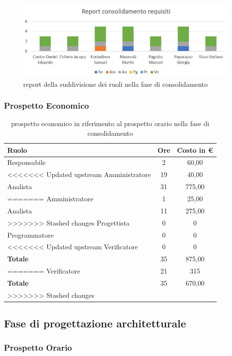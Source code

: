 \documentclass[../piano_di_progetto.tex]{subfiles}
\begin{document}
\begin{figure}[H]
\centering
\includegraphics[width=12cm]{componenti/img/report_consolidamento}
\caption{report della suddivisione dei ruoli nella fase di consolidamento}
\end{figure}

\subsubsection{Prospetto Economico}

\begin{longtable}{|l|c|c|}
	\hline
	\rowcolor{lightgray}
	\textbf{Ruolo} & \textbf{Ore} & \textbf{Costo in €}\\
	\endhead
	\hline
	Responsabile & 2 & 60,00 \\
<<<<<<< Updated upstream
	Amministratore & 19 & 40,00 \\
	Analista & 31 & 775,00 \\
=======
	\hline
	Amministratore & 1 & 25,00 \\
	\hline
	Analista & 11 & 275,00 \\
	\hline
>>>>>>> Stashed changes
	Progettista & 0 & 0 \\
	Programmatore & 0 & 0 \\
<<<<<<< Updated upstream
	Verificatore & 0 & 0 \\
	\textbf{Totale} & 35 & 875,00\\
=======
	\hline
	Verificatore & 21 & 315 \\
	\hline
	\textbf{Totale} & 35 & 670,00 \\
>>>>>>> Stashed changes
	\hline
	\rowcolor{white}
	\caption{prospetto economico in riferimento al prospetto orario nella fase di consolidamento} 
\end{longtable}

\subsection{ Fase di progettazione architetturale}%
\label{sub:fase_prog_arc}
\subsubsection{Prospetto Orario}
\end{document}
